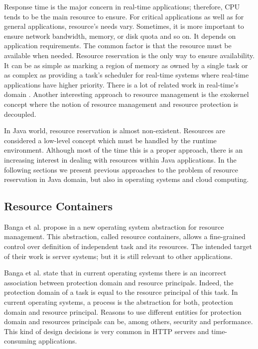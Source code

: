 Response time is the major concern in real-time applications; therefore, CPU tends to be the main resource to ensure.
For critical applications  as well as for general applications, resource's needs vary.
Sometimes, it is more important to ensure network bandwidth, memory, or disk quota and so on.
It depends on application requirements.
The common factor is that the resource must be available when needed.
Resource reservation is the only way to ensure availability.
It can be as simple as marking a region of memory as owned by a single task or as complex as providing a task's scheduler for real-time systems where real-time applications have higher priority.
There is a lot of related work in real-time's domain \cite{Kirsch:2005:PMR:1064979.1064986, Zuberi:1999:ESR:319151.319170, Higuera-Toledano:2012:YRJ:2388936.2388943, Alonso:2006:FJR:1167999.1168022}.
Another interesting approach to resource management is the exokernel concept \cite{Engler:1995:EOS:224056.224076} where the notion of resource management and resource protection is decoupled.

In Java world, resource reservation is almost non-existent.
Resources are considered a low-level concept which must be handled by the runtime environment.
Although most of the time this is a proper approach, there is an increasing interest in dealing with resources within Java applications.
In the following sections we present previous approaches to the problem of resource reservation in Java domain, but also in operating systems and cloud computing.

\subsection{Resource Containers}
Banga et al. propose in \cite{Banga:1999:RCN:296806.296810} a new operating system abstraction for resource management.
This abstraction, called resource containers, allows a fine-grained control over definition of independent task and its resources.
The intended target of their work is server systems; but it is still relevant to other applications.

Banga et al. state that in current operating systems there is an incorrect association between protection domain and resource principals.
Indeed, the protection domain of a task is equal to the resource principal of this task.
In current operating systems, a process is the abstraction for both, protection domain and resource principal.
Reasons to use different entities for protection domain and resources principals can be, among others, security and performance.
This kind of design decisions is very common in HTTP servers and time-consuming applications.

